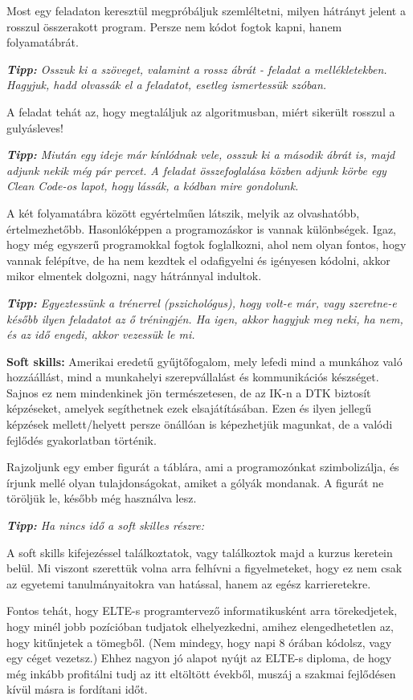 \documentclass[../Main.tex]{subfiles}
\begin{document}
Most egy feladaton keresztül megpróbáljuk szemléltetni, milyen hátrányt jelent a rosszul összerakott program.
Persze nem kódot fogtok kapni, hanem folyamatábrát.

\textit{\textbf{Tipp:}
Osszuk ki a szöveget, valamint a rossz ábrát - feladat a mellékletekben.
Hagyjuk, hadd olvassák el a feladatot, esetleg ismertessük szóban.
}

A feladat tehát az, hogy megtaláljuk az algoritmusban, miért sikerült rosszul a gulyásleves!

\textit{\textbf{Tipp:}
Miután egy ideje már kínlódnak vele, osszuk ki a második ábrát is, majd adjunk nekik még pár percet.
A feladat összefoglalása közben adjunk körbe egy Clean Code-os lapot, hogy lássák, a kódban mire gondolunk.
}

A két folyamatábra között egyértelműen látszik, melyik az olvashatóbb, értelmezhetőbb.
Hasonlóképpen a programozáskor is vannak különbségek.
Igaz, hogy még egyszerű programokkal fogtok foglalkozni, ahol nem olyan fontos, hogy vannak felépítve, de ha nem kezdtek el odafigyelni és igényesen kódolni, akkor mikor elmentek dolgozni, nagy hátránnyal indultok.


\textit{\textbf{Tipp:}
Egyeztessünk a trénerrel (pszichológus), hogy volt-e már, vagy szeretne-e később ilyen feladatot az ő tréningjén.
Ha igen, akkor hagyjuk meg neki, ha nem, és az idő engedi, akkor vezessük le mi.
}

\textbf{Soft skills:}
Amerikai eredetű gyűjtőfogalom, mely lefedi mind a munkához való hozzáállást, mind a munkahelyi szerepvállalást és kommunikációs készséget.
Sajnos ez nem mindenkinek jön természetesen, de az IK-n a DTK biztosít képzéseket, amelyek segíthetnek ezek elsajátításában.
Ezen és ilyen jellegű képzések mellett/helyett persze önállóan is képezhetjük magunkat, de a valódi fejlődés gyakorlatban történik.

Rajzoljunk egy ember figurát a táblára, ami a programozónkat szimbolizálja, és írjunk mellé olyan tulajdonságokat, amiket a gólyák mondanak.
A figurát ne töröljük le, később még használva lesz.


\textit{\textbf{Tipp:}
Ha nincs idő a soft skilles részre:
}

A soft skills kifejezéssel találkoztatok, vagy találkoztok majd a kurzus keretein belül.
Mi viszont szerettük volna arra felhívni a figyelmeteket, hogy ez nem csak az egyetemi tanulmányaitokra van hatással, hanem az egész karrieretekre.

Fontos tehát, hogy ELTE-s programtervező informatikusként arra törekedjetek, hogy minél jobb pozícióban tudjatok elhelyezkedni, amihez elengedhetetlen az, hogy kitűnjetek a tömegből.
(Nem mindegy, hogy napi 8 órában kódolsz, vagy egy céget vezetsz.)
Ehhez nagyon jó alapot nyújt az ELTE-s diploma, de hogy még inkább profitálni tudj az itt eltöltött évekből, muszáj a szakmai fejlődésen kívül másra is fordítani időt.
\end{document}
